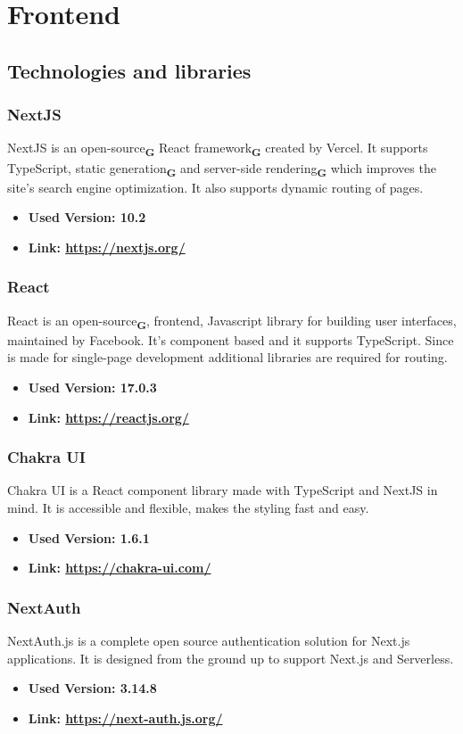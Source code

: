 \section{Frontend}
\subsection{Technologies and libraries}
\subsubsection{NextJS}
NextJS is an open-source\textsubscript{\textbf{G}} React framework\textsubscript{\textbf{G}} created by Vercel. It supports TypeScript, static generation\textsubscript{\textbf{G}} and server-side rendering\textsubscript{\textbf{G}} which improves the site's search engine optimization. It also supports dynamic routing of pages.
\begin{itemize}
  \item \textbf{Used Version: 10.2}
  \item \textbf{Link: \url{https://nextjs.org/}}
\end{itemize}
\subsubsection{React}
React is an open-source\textsubscript{\textbf{G}}, frontend, Javascript library for building user interfaces, maintained by Facebook. It's component based and it supports TypeScript. Since is made for single-page development additional libraries are required for routing.
\begin{itemize}
  \item \textbf{Used Version: 17.0.3}
  \item \textbf{Link: \url{https://reactjs.org/}}
\end{itemize}
\subsubsection{Chakra UI}
Chakra UI is a React component library made with TypeScript and NextJS in mind. It is accessible and flexible, makes the styling fast and easy.
\begin{itemize}
  \item \textbf{Used Version: 1.6.1}
  \item \textbf{Link: \url{https://chakra-ui.com/}}
\end{itemize}
\subsubsection{NextAuth}
NextAuth.js is a complete open source authentication solution for Next.js applications. It is designed from the ground up to support Next.js and Serverless.
\begin{itemize}
  \item \textbf{Used Version: 3.14.8}
  \item \textbf{Link: \url{https://next-auth.js.org/}}
\end{itemize}
